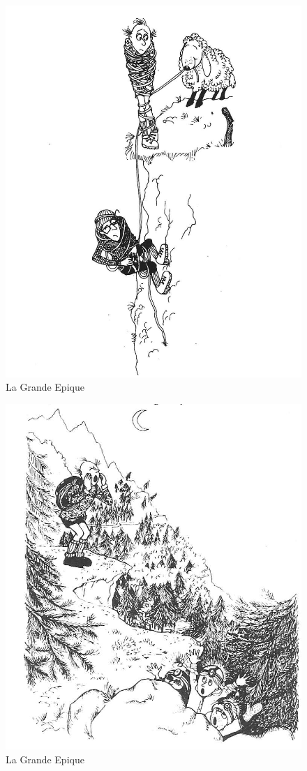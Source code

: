 \documentclass[a5paper,openany,font 10pt]{scrbook}
\begin{document}
\begin{figure}[htb]
\centering
\includegraphics[width=.9\linewidth]{./images/Cartoon_13.jpg}
\caption{\label{fig:org1f20f47}
La Grande Epique}
\end{figure}

\begin{figure}[htb]
\centering
\includegraphics[width=.9\linewidth]{./images/Cartoon_14.jpg}
\caption{\label{fig:org9959041}
La Grande Epique}
\end{figure}
\end{document}
